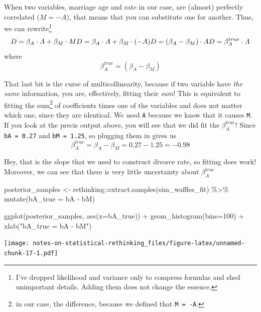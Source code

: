 \documentclass[
]{book}
\newenvironment{Shaded}{\begin{snugshade}}{\end{snugshade}}
\newcommand{\AttributeTok}[1]{\textcolor[rgb]{0.77,0.63,0.00}{#1}}
\newcommand{\DecValTok}[1]{\textcolor[rgb]{0.00,0.00,0.81}{#1}}
\newcommand{\FunctionTok}[1]{\textcolor[rgb]{0.00,0.00,0.00}{#1}}
\newcommand{\NormalTok}[1]{#1}
\newcommand{\OtherTok}[1]{\textcolor[rgb]{0.56,0.35,0.01}{#1}}
\newcommand{\SpecialCharTok}[1]{\textcolor[rgb]{0.00,0.00,0.00}{#1}}
\newcommand{\StringTok}[1]{\textcolor[rgb]{0.31,0.60,0.02}{#1}}
\begin{document}
When two variables, marriage age and rate in our case, are (almost) perfectly correlated (\(M = -A\)), that means that you can substitute one for another. Thus, we can rewrite\footnote{I've dropped likelihood and variance only to compress formulas and shed unimportant details. Adding them does not change the essence.}
\[D = \beta_A \cdot A + \beta_M \cdot M \\
D = \beta_A \cdot A + \beta_M \cdot (-A) \\
D = (\beta_A - \beta_M) \cdot A \\
D = \beta_A^{true} \cdot A\]
where
\[ \beta_A^{true} = (\beta_A - \beta_M)\]

That last bit is the curse of multicollinearity, because if two variable have \emph{the same} information, you are, effectively, fitting their \emph{sum}! This is equivalent to fitting the sum\footnote{in our case, the difference, because we defined that \texttt{M\ =\ -A}.} of coefficients times one of the variables and does not matter which one, since they are identical. We used \texttt{A} because we know that it causes \texttt{M}. If you look at the precis output above, you will see that we did fit the \(\beta_A^{true}\)! Since \texttt{bA\ =\ 0.27} and \texttt{bM\ =\ 1.25}, so plugging them in gives us
\[\beta_A^{true} = \beta_A - \beta_M = 0.27 - 1.25 = -0.98\]

Hey, that is the slope that we used to construct divorce rate, so fitting does work! Moreover, we can see that there is very little uncertainty about \(\beta_A^{true}\)

\begin{Shaded}
\begin{Highlighting}[]
\NormalTok{posterior\_samples }\OtherTok{\textless{}{-}} 
\NormalTok{  rethinking}\SpecialCharTok{::}\FunctionTok{extract.samples}\NormalTok{(sim\_waffles\_fit) }\SpecialCharTok{\%\textgreater{}\%}
  \FunctionTok{mutate}\NormalTok{(}\AttributeTok{bA\_true =}\NormalTok{ bA }\SpecialCharTok{{-}}\NormalTok{ bM)}

\FunctionTok{ggplot}\NormalTok{(posterior\_samples, }\FunctionTok{aes}\NormalTok{(}\AttributeTok{x=}\NormalTok{bA\_true)) }\SpecialCharTok{+} 
  \FunctionTok{geom\_histogram}\NormalTok{(}\AttributeTok{bins=}\DecValTok{100}\NormalTok{) }\SpecialCharTok{+} 
  \FunctionTok{xlab}\NormalTok{(}\StringTok{"bA\_true = bA {-} bM"}\NormalTok{)}
\end{Highlighting}
\end{Shaded}

\texttt{[image: notes-on-statistical-rethinking\_files/figure-latex/unnamed-chunk-17-1.pdf]}
\end{document}
